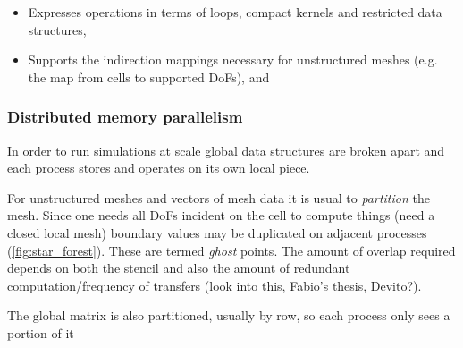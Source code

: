 \documentclass[thesis]{subfiles}
\begin{document}
\begin{itemize}
  \item
    Expresses operations in terms of loops, compact kernels and restricted data structures,
  \item
    Supports the indirection mappings necessary for unstructured meshes (e.g. the map from cells to supported DoFs), and
\end{itemize}




\subsubsection{Distributed memory parallelism}
\label{sec:intro_mpi}


In order to run simulations at scale global data structures are broken apart and each process stores and operates on its own local piece.


For unstructured meshes and vectors of mesh data it is usual to \textit{partition} the mesh.
Since one needs all DoFs incident on the cell to compute things (need a closed local mesh) boundary values may be duplicated on adjacent processes (\cref{fig:star_forest}).
These are termed \textit{ghost} points.
The amount of overlap required depends on both the stencil and also the amount of redundant computation/frequency of transfers (look into this, Fabio's thesis, Devito?).

The global matrix is also partitioned, usually by row, so each process only sees a portion of it

\end{document}
